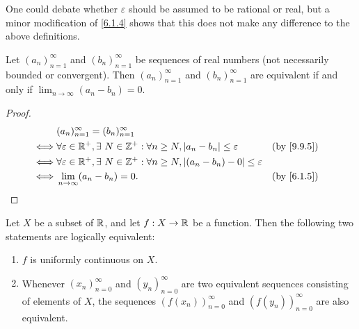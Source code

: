 \begin{rmk}\label{9.9.6}
  One could debate whether \(\varepsilon\) should be assumed to be rational or real, but a minor modification of \cref{6.1.4} shows that this does not make any difference to the above definitions.
\end{rmk}

\begin{lem}\label{9.9.7}
  Let \((a_n)_{n = 1}^\infty\) and \((b_n)_{n = 1}^\infty\) be sequences of real numbers
  (not necessarily bounded or convergent).
  Then \((a_n)_{n = 1}^\infty\) and \((b_n)_{n = 1}^\infty\) are equivalent if and only if \(\lim_{n \to \infty} (a_n - b_n) = 0\).
\end{lem}

\begin{proof}
  \begin{align*}
         & (a_n)_{n = 1}^\infty = (b_n)_{n = 1}^\infty                                                                                  \\
    \iff & \forall \varepsilon \in \R^+, \exists\ N \in \Z^+ : \forall n \geq N, \abs{a_n - b_n} \leq \varepsilon       &  & \by{9.9.5} \\
    \iff & \forall \varepsilon \in \R^+, \exists\ N \in \Z^+ : \forall n \geq N, \abs{(a_n - b_n) - 0} \leq \varepsilon                 \\
    \iff & \lim_{n \to \infty} (a_n - b_n) = 0.                                                                         &  & \by{6.1.5}
  \end{align*}
\end{proof}

\begin{prop}\label{9.9.8}
  Let \(X\) be a subset of \(\mathbb{R}\), and let \(f : X \to \mathbb{R}\) be a function.
  Then the following two statements are logically equivalent:
  \begin{enumerate}
    \item \(f\) is uniformly continuous on \(X\).
    \item Whenever \((x_n)_{n = 0}^\infty\) and \((y_n)_{n = 0}^\infty\) are two equivalent sequences consisting of elements of \(X\), the sequences \((f(x_n))_{n = 0}^\infty\) and \((f(y_n))_{n = 0}^\infty\) are also equivalent.
  \end{enumerate}
\end{prop}

